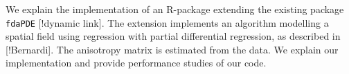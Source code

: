 We explain the implementation of an R-package extending the existing package \texttt{fdaPDE} [!dynamic link]. The extension implements an algorithm modelling a spatial field using regression with partial differential regression, as described in \cite{Bernardi} [!Bernardi]. The anisotropy matrix is estimated from the data. We explain our implementation and provide performance studies of our code.
